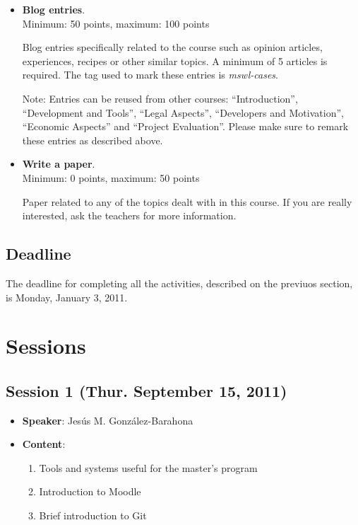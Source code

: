 \documentclass[a4paper]{article}
\begin{document}
\begin{itemize}

\item \textbf{Blog entries}. \\
  Minimum: 50 points, maximum: 100 points

  Blog entries specifically related to the course such as opinion articles, experiences, 
recipes or other similar topics. A minimum of 5 articles is required. The tag used to mark
these entries is \textit{mswl-cases}.

 Note: Entries can be reused from other courses: ``Introduction'', ``Development and Tools'',
``Legal Aspects'', ``Developers and Motivation'', ``Economic Aspects'' and ``Project Evaluation''. 
Please make sure to remark these entries as described above.

\item \textbf{Write a paper}. \\
  Minimum: 0 points, maximum: 50 points

  Paper related to any of the topics dealt with in this course. If you are really interested, ask the teachers for more information.

\end{itemize}

\subsection{Deadline}

The deadline for completing all the activities, described on the previuos section, is Monday, January 3, 2011.

\section{Sessions}

\subsection{Session 1 (Thur. September 15, 2011)}

\begin{itemize}
 \item \textbf{Speaker}: Jesús M. González-Barahona

 \item \textbf{Content}:

  \begin{enumerate}
   \item Tools and systems useful for the master's program
   \item Introduction to Moodle
   \item Brief introduction to Git
  \end{enumerate}

\end{itemize}
\end{document}

